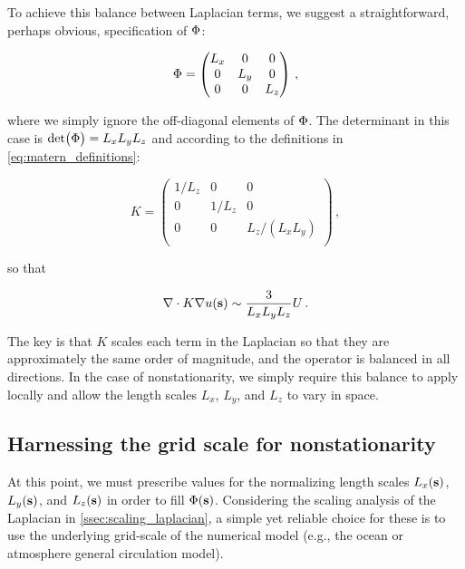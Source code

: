 To achieve this balance between Laplacian terms, we suggest a straightforward,
perhaps obvious, specification of $\Phi$:
\begin{linenomath*}\begin{equation*}
    \Phi =
        \begin{pmatrix}
            L_x & 0 & 0     \\
            0 & L_y & 0     \\
            0 & 0   & L_z   \\
        \end{pmatrix} \, ,
\end{equation*}\end{linenomath*}
where we simply ignore the off-diagonal elements of $\Phi$.
The determinant in this case is $\text{det}\big(\Phi\big) = L_xL_yL_z$ and
according to the definitions in \cref{eq:matern_definitions}:
\begin{linenomath*}\begin{equation*}
    K =
        \begin{pmatrix}
            1/L_z & 0 & 0     \\
            0 & 1/L_z & 0     \\
            0 & 0   & L_z/(L_xL_y)   \\
        \end{pmatrix} \, ,
\end{equation*}\end{linenomath*}
so that
\begin{linenomath*}\begin{equation*}
    \nabla\cdot K\nabla u(\mathbf{s}) \sim \dfrac{3}{L_xL_yL_z}U \, .
\end{equation*}\end{linenomath*}
The key is that $K$ scales each term in the Laplacian so that they are
approximately the same order of magnitude, and the operator is balanced in all
directions.
In the case of nonstationarity, we simply require this balance to apply locally
and allow the length scales $L_x$, $L_y$, and $L_z$ to vary in space.


\subsection{Harnessing the grid scale for nonstationarity}
\label{ssec:nonstationarity}

At this point, we must prescribe values for the normalizing length scales
$L_x(\mathbf{s})$, $L_y(\mathbf{s})$, and $L_z(\mathbf{s})$ in order to fill $\Phi(\mathbf{s})$.
Considering the scaling analysis of the Laplacian in
\cref{ssec:scaling_laplacian}, a simple yet reliable choice for these
is to use the underlying grid-scale of the numerical model (e.g., the ocean or
atmosphere general circulation model).

